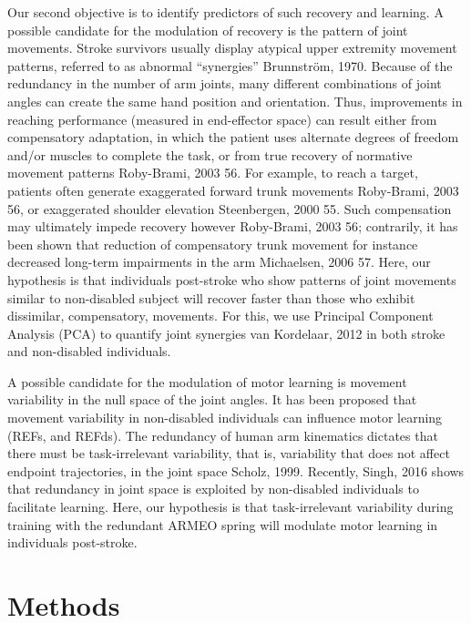 Our second objective is to identify predictors of such recovery and learning. 
A possible candidate for the modulation of recovery is the pattern of joint movements. 
Stroke survivors usually display atypical upper extremity movement patterns, referred to as abnormal “synergies” {Brunnström, 1970}. 
Because of the redundancy in the number of arm joints, many different combinations of joint angles can create the same hand position and orientation. 
Thus, improvements in reaching performance (measured in end-effector space) can result either from compensatory adaptation, in which the patient uses alternate degrees of freedom and/or muscles to complete the task, or from true recovery of normative movement patterns {Roby-Brami, 2003 56}. 
For example, to reach a target, patients often generate exaggerated forward trunk movements {Roby-Brami, 2003 56}, or exaggerated shoulder elevation {Steenbergen, 2000 55}.  
Such compensation may ultimately impede recovery however {Roby-Brami, 2003 56}; contrarily, it has been shown that reduction of compensatory trunk movement for instance decreased long-term impairments in the arm {Michaelsen, 2006 57}. 
Here, our hypothesis is that individuals post-stroke who show patterns of joint movements similar to non-disabled subject will recover faster than those who exhibit dissimilar, compensatory, movements.
For this, we use Principal Component Analysis (PCA) to quantify joint synergies {van Kordelaar, 2012} in both stroke and non-disabled individuals.

A possible candidate for the modulation of motor learning is movement variability in the null space of the joint angles. 
It has been proposed that movement variability in non-disabled individuals can influence motor learning (REFs, and REFds). 
The redundancy of human arm kinematics dictates that there must be task-irrelevant variability, that is, variability that does not affect endpoint trajectories, in the joint space {Scholz, 1999}. 
Recently, {Singh, 2016} shows that redundancy in joint space is exploited by non-disabled individuals to facilitate learning. 
Here, our hypothesis is that task-irrelevant variability during training with the redundant ARMEO spring will modulate motor learning in individuals post-stroke.

 

\section{Methods}

